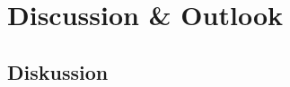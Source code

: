 
\chapter{Discussion \& Outlook} %



\ifpdf
    \graphicspath{{7/figures/PNG/}{7/figures/PDF/}{7/figures/}}
\else
    \graphicspath{{7/figures/EPS/}{7/figures/}}
\fi





\section{Diskussion}

